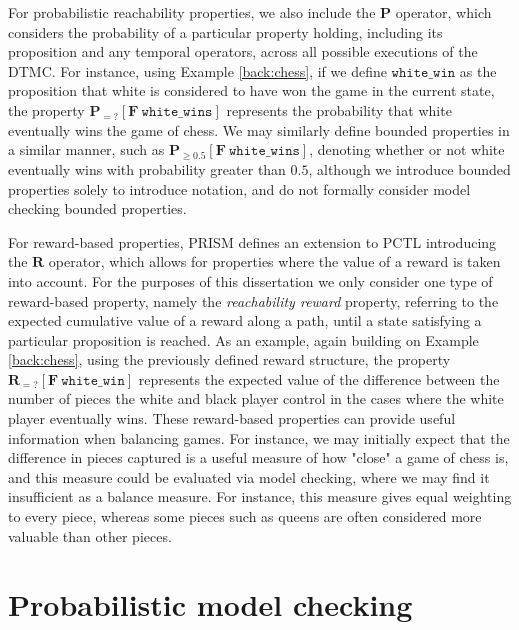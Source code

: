 For probabilistic reachability properties, we also include the $\mathbf{P}$ operator, which considers the probability of a particular property holding, including its proposition and any temporal operators, across all possible executions of the DTMC. For instance, using Example \ref{back:chess}, if we define $\mathtt{white\_win}$ as the proposition that white is considered to have won the game in the current state, the property $\mathbf{P}_{=?} [\mathbf{F}\ \mathtt{white\_wins}]$ represents the probability that white eventually wins the game of chess. We may similarly define bounded properties in a similar manner, such as $\mathbf{P}_{\geq 0.5} [\mathbf{F}\ \mathtt{white\_wins}]$, denoting whether or not white eventually wins with probability greater than $0.5$, although we introduce bounded properties solely to introduce notation, and do not formally consider model checking bounded properties.

For reward-based properties, PRISM defines an extension to PCTL introducing the $\mathbf{R}$ operator, which allows for properties where the value of a reward is taken into account. For the purposes of this dissertation we only consider one type of reward-based property, namely the \emph{reachability reward} property, referring to the expected cumulative value of a reward along a path, until a state satisfying a particular proposition is reached. As an example, again building on Example \ref{back:chess}, using the previously defined reward structure, the property $\mathbf{R}_{=?} [\mathbf{F}\ \mathtt{white\_win}]$ represents the expected value of the difference between the number of pieces the white and black player control in the cases where the white player eventually wins. These reward-based properties can provide useful information when balancing games. For instance, we may initially expect that the difference in pieces captured is a useful measure of how "close" a game of chess is, and this measure could be evaluated via model checking, where we may find it insufficient as a balance measure. For instance, this measure gives equal weighting to every piece, whereas some pieces such as queens are often considered more valuable than other pieces.

\section{Probabilistic model checking}
\label{back:prob_mod_check}


